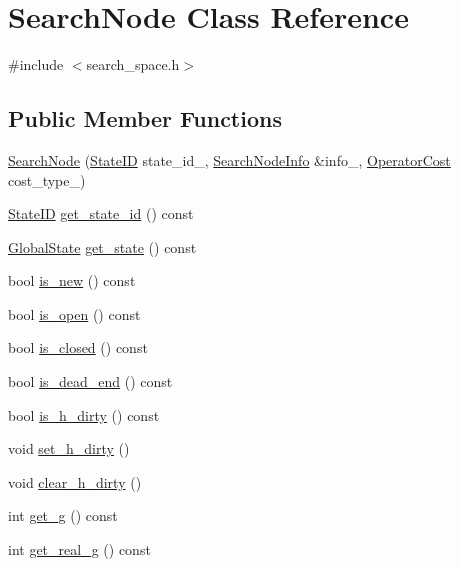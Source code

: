 \hypertarget{classSearchNode}{\section{Search\-Node Class Reference}
\label{classSearchNode}
}


{\ttfamily \#include $<$search\-\_\-space.\-h$>$}

\subsection*{Public Member Functions}
\begin{DoxyCompactItemize}
\item 
\hyperlink{classSearchNode_a31749c0d124254d50a3b7d1887eca531}{Search\-Node} (\hyperlink{classStateID}{State\-I\-D} state\-\_\-id\-\_\-, \hyperlink{structSearchNodeInfo}{Search\-Node\-Info} \&info\-\_\-, \hyperlink{operator__cost_8h_aea97a5a2fbe3b57faf505007e38f5de9}{Operator\-Cost} cost\-\_\-type\-\_\-)
\item 
\hyperlink{classStateID}{State\-I\-D} \hyperlink{classSearchNode_a1683291b8c3cc021eebc962a33a188d8}{get\-\_\-state\-\_\-id} () const 
\item 
\hyperlink{classGlobalState}{Global\-State} \hyperlink{classSearchNode_a2b9024c1cefb9d38663d9b6c24b060e6}{get\-\_\-state} () const 
\item 
bool \hyperlink{classSearchNode_a8b39e4ab527b2ff96fac4cebd0dc03b2}{is\-\_\-new} () const 
\item 
bool \hyperlink{classSearchNode_a825e90bb6b6652666b7854b77f38f5db}{is\-\_\-open} () const 
\item 
bool \hyperlink{classSearchNode_a62bdaff59af0aa9c5f712cded05b97ef}{is\-\_\-closed} () const 
\item 
bool \hyperlink{classSearchNode_a122f43b9dcf7e5be7aca4b81bfcc9b5b}{is\-\_\-dead\-\_\-end} () const 
\item 
bool \hyperlink{classSearchNode_a450682f6fc503846e9230245ba057eda}{is\-\_\-h\-\_\-dirty} () const 
\item 
void \hyperlink{classSearchNode_ad5db250a2114bbb97c16f19f4ada06e7}{set\-\_\-h\-\_\-dirty} ()
\item 
void \hyperlink{classSearchNode_a2c5240c7948a08d397c0fe235403c3ac}{clear\-\_\-h\-\_\-dirty} ()
\item 
int \hyperlink{classSearchNode_aa299b21012d7fa1f90c3bccef5df8439}{get\-\_\-g} () const 
\item 
int \hyperlink{classSearchNode_a96eb7376415f022f090d45b68e5a7b90}{get\-\_\-real\-\_\-g} () const 

\end{DoxyCompactItemize}
